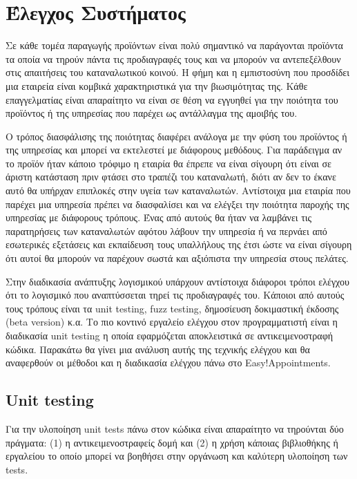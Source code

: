 
\chapter{Έλεγχος Συστήματος}
Σε κάθε τομέα παραγωγής προϊόντων είναι πολύ σημαντικό να παράγονται προϊόντα τα οποία να τηρούν πάντα τις προδιαγραφές τους και να μπορούν να αντεπεξέλθουν στις απαιτήσεις του καταναλωτικού κοινού. Η φήμη και η εμπιστοσύνη που προσδίδει μια εταιρεία είναι κομβικά χαρακτηριστικά για την βιωσιμότητας της. Κάθε επαγγελματίας είναι απαραίτητο να είναι σε θέση να εγγυηθεί για την ποιότητα του προϊόντος ή της υπηρεσίας που παρέχει ως αντάλλαγμα της αμοιβής του.

Ο τρόπος διασφάλισης της ποιότητας διαφέρει ανάλογα με την φύση του προϊόντος ή της υπηρεσίας και μπορεί να εκτελεστεί με διάφορους μεθόδους. Για παράδειγμα αν το προϊόν ήταν κάποιο τρόφιμο η εταιρία θα έπρεπε να είναι σίγουρη ότι είναι σε άριστη κατάσταση πριν φτάσει στο τραπέζι του καταναλωτή, διότι αν δεν το έκανε αυτό θα υπήρχαν επιπλοκές στην υγεία των καταναλωτών. Αντίστοιχα μια εταιρία που παρέχει μια υπηρεσία πρέπει να διασφαλίσει και να ελέγξει την ποιότητα παροχής της υπηρεσίας με διάφορους τρόπους. Ένας από αυτούς θα ήταν να λαμβάνει τις παρατηρήσεις των καταναλωτών αφότου λάβουν την υπηρεσία ή να περνάει από εσωτερικές εξετάσεις και εκπαίδευση τους υπαλλήλους της έτσι ώστε να είναι σίγουρη ότι αυτοί θα μπορούν να παρέχουν σωστά και αξιόπιστα την υπηρεσία στους πελάτες.

Στην διαδικασία ανάπτυξης λογισμικού υπάρχουν αντίστοιχα διάφοροι τρόποι ελέγχου ότι το λογισμικό που αναπτύσσεται τηρεί τις προδιαγραφές του. Κάποιοι από αυτούς τους τρόπους είναι τα unit testing, fuzz testing, δημοσίευση δοκιμαστική έκδοσης (beta version) κ.α. Το πιο κοντινό εργαλείο ελέγχου στον προγραμματιστή είναι η διαδικασία unit testing η οποία εφαρμόζεται αποκλειστικά σε αντικειμενοστραφή κώδικα. Παρακάτω θα γίνει μια ανάλυση αυτής της τεχνικής ελέγχου και θα αναφερθούν οι μέθοδοι και η διαδικασία ελέγχου πάνω στο Easy!Appointments.

\section {Unit testing}
Για την υλοποίηση unit tests πάνω στον κώδικα είναι απαραίτητο να τηρούνται δύο πράγματα: (1) η αντικειμενοστραφείς δομή και (2) η χρήση κάποιας βιβλιοθήκης ή εργαλείου το οποίο μπορεί να βοηθήσει στην οργάνωση και καλύτερη υλοποίηση των tests.

